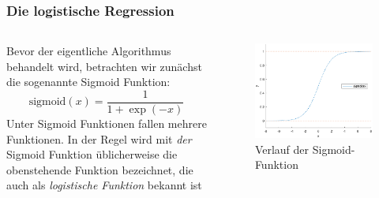 \begin{frame}
\frametitle{Die logistische Regression}
\begin{columns}[T]
        \begin{column}{0.49\textwidth}
        	\vspace{0.5cm}Bevor der eigentliche Algorithmus behandelt wird, betrachten wir zunächst die sogenannte Sigmoid Funktion:
				\begin{equation*}
					\text{sigmoid}(x) = \frac{1}{1+\exp(-x)}
				\end{equation*}
			Unter Sigmoid Funktionen fallen mehrere Funktionen. In der Regel wird mit \textit{der} Sigmoid Funktion üblicherweise die obenstehende Funktion 				bezeichnet, die auch als \textit{logistische Funktion} bekannt ist
        \end{column}
        \begin{column}{0.49\textwidth}
            \begin{figure}[hbtp]
				\centering
				\includegraphics[scale=0.5]{images/plot_sigmoid.eps}
				\caption{Verlauf der Sigmoid-Funktion}
			\end{figure}
        \end{column}
    \end{columns}
\end{frame}
